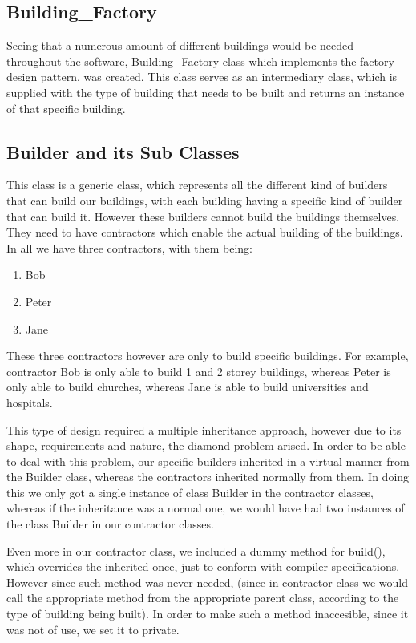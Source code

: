 \documentclass[12pt, A4]{report}
\begin{document}
		\subsection*{Building\_Factory}
		Seeing that a numerous amount of different buildings would be needed throughout the software, Building\_Factory class which implements the factory design pattern, was created. This class serves as an intermediary class, which is supplied with the type of building that needs to be built and returns an instance of that specific building.

		\subsection*{Builder and its Sub Classes}
		This class is a generic class, which represents all the different kind of builders that can build our buildings, with each building having a specific kind of builder that can build it. However these builders cannot build the buildings themselves. They need to have contractors which enable the actual building of the buildings. In all we have three contractors, with them being: 
		\begin{enumerate}
			\item Bob
		 	\item Peter
		 	\item Jane
		\end{enumerate}
		\par
		These three contractors however are only to build specific buildings. For example, contractor Bob is only able to build 1 and 2 storey buildings, whereas Peter is only able to build churches, whereas Jane is able to build universities and hospitals.
		\par
		This type of design required a multiple inheritance approach, however due to its shape, requirements and nature, the diamond problem arised. In order to be able to deal with this problem, our specific builders inherited in a virtual manner from the Builder class, whereas the contractors inherited normally from them. In doing this we only got a single instance of class Builder in the contractor classes, whereas if the inheritance was a normal one, we would have had two instances of the class Builder in our contractor classes. 
		\par
		Even more in our contractor class, we included a dummy method for build(), which overrides the inherited once, just to conform with compiler specifications. However since such method was never needed, (since in contractor class we would call the appropriate method from the appropriate parent class, according to the type of building being built). In order to make such a method inaccesible, since it was not of use, we set it to private.
		
\end{document}
